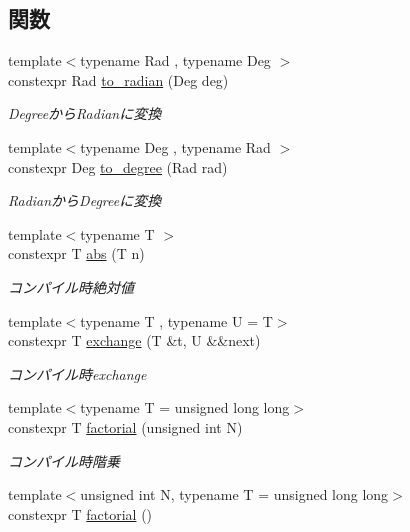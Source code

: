 \subsection*{関数}
\begin{DoxyCompactItemize}
\item 
{\footnotesize template$<$typename Rad , typename Deg $>$ }\\constexpr Rad \mbox{\hyperlink{namespacesaki_aae246ec576e9e2da23c0c142e6fc4d6a}{to\+\_\+radian}} (Deg deg)
\begin{DoxyCompactList}\small\item\em Degreeから\+Radianに変換 \end{DoxyCompactList}\item 
{\footnotesize template$<$typename Deg , typename Rad $>$ }\\constexpr Deg \mbox{\hyperlink{namespacesaki_aa28ebe642bd2c0e608e2a61c34b3d7a5}{to\+\_\+degree}} (Rad rad)
\begin{DoxyCompactList}\small\item\em Radianから\+Degreeに変換 \end{DoxyCompactList}\item 
{\footnotesize template$<$typename T $>$ }\\constexpr T \mbox{\hyperlink{namespacesaki_a012046e05c5909bb34ca3e609ca74ff3}{abs}} (T n)
\begin{DoxyCompactList}\small\item\em コンパイル時絶対値 \end{DoxyCompactList}\item 
{\footnotesize template$<$typename T , typename U  = T$>$ }\\constexpr T \mbox{\hyperlink{namespacesaki_a41390f371e093d85f55a61f26277c185}{exchange}} (T \&t, U \&\&next)
\begin{DoxyCompactList}\small\item\em コンパイル時exchange \end{DoxyCompactList}\item 
{\footnotesize template$<$typename T  = unsigned long long$>$ }\\constexpr T \mbox{\hyperlink{namespacesaki_a59cd7e099937e5f8bcf5aa612745690c}{factorial}} (unsigned int N)
\begin{DoxyCompactList}\small\item\em コンパイル時階乗 \end{DoxyCompactList}\item 
{\footnotesize template$<$unsigned int N, typename T  = unsigned long long$>$ }\\constexpr T \mbox{\hyperlink{namespacesaki_a9dead910b791cee99cf82d1bd2a5d90c}{factorial}} ()

\end{DoxyCompactItemize}
